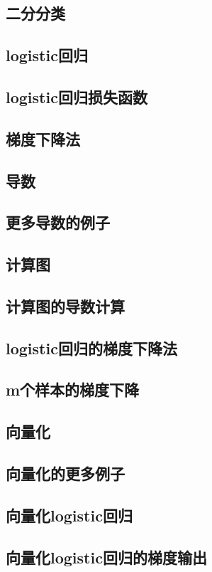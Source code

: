 \documentclass{article}
\begin{document}
\begin{CJK}{UTF8}{gbsn}
\subsection{二分分类}
\subsection{logistic回归}
\subsection{logistic回归损失函数}
\subsection{梯度下降法}
\subsection{导数}
\subsection{更多导数的例子}
\subsection{计算图}
\subsection{计算图的导数计算}
\subsection{logistic回归的梯度下降法}
\subsection{m个样本的梯度下降}
\subsection{向量化}
\subsection{向量化的更多例子}
\subsection{向量化logistic回归}
\subsection{向量化logistic回归的梯度输出}

\end{CJK}
\end{document}
